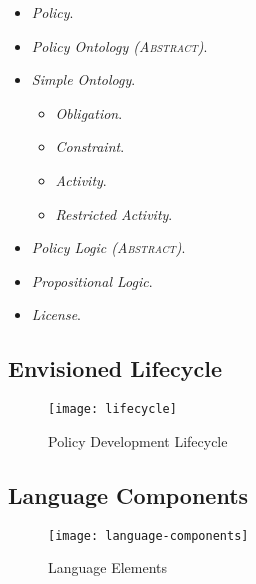 \begin{itemize}
\begin{itemize}
\end{itemize}
\item \textit{Policy}.
\item \textit{Policy Ontology (\textsc{Abstract})}.
\item \textit{Simple Ontology}.
\begin{itemize}
\item \textit{Obligation}.
\item \textit{Constraint}.
\item \textit{Activity}.
\item \textit{Restricted Activity}.
\end{itemize}
\item \textit{Policy Logic (\textsc{Abstract})}.
\item \textit{Propositional Logic}.
\item \textit{License}.
\end{itemize}

\subsection{Envisioned Lifecycle}

\begin{figure}[!t]
\centering
\texttt{[image: lifecycle]}
\caption{Policy Development Lifecycle}
\label{fig:model:lifecycle}
\end{figure}

\subsection{Language Components}

\begin{figure}[!t]
\centering
\texttt{[image: language-components]}
\caption{Language Elements}
\label{fig:model:language-components}
\end{figure}
